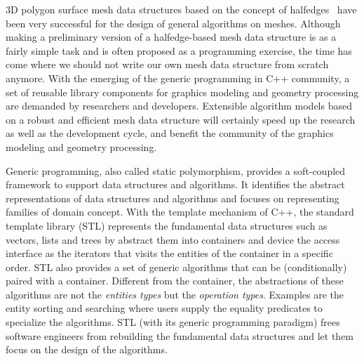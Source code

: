 3D polygon surface mesh data structures based on the concept of
halfedges~\cite{k-ugpdd-99} have been very successful for the design
of general algorithms on meshes. 
Although making a preliminary version of a halfedge-based mesh data
structure is as a fairly simple task and is often proposed as a
programming exercise, the time has come where we should not write our
own mesh data structure from scratch anymore. With the emerging of
the generic programming in C++ community, a set of reusable library
components for graphics modeling and geometry processing are demanded
by researchers and developers. Extensible algorithm models based on
a robust and efficient mesh data structure will certainly speed up
the research as well as the development cycle, and benefit the 
community of the graphics modeling and geometry processing.  

Generic programming, also called static polymorphism, 
provides a soft-coupled framework to support  
data structures and algorithms. It identifies 
the abstract representations of data structures and algorithms
and focuses on representing families of domain concept.
With the template mechanism of C++, the standard template 
library \cite{} (STL) represents the fundamental data 
structures such as vectors, lists and trees by abstract
them into containers and device the access interface as 
the iterators that visits the entities of the container
in a specific order. STL also provides a set of generic 
algorithms that can be (conditionally) paired with a container.
Different from the container, the abstractions 
of these algorithms are not the \emph{entities types} 
but the \emph{operation types}. 
Examples are the entity sorting and searching where users
supply the equality predicates to specialize the algorithms.
STL (with its generic programming paradigm) 
frees software engineers from rebuilding
the fundamental data structures and let them focus on the design 
of the algorithms.

